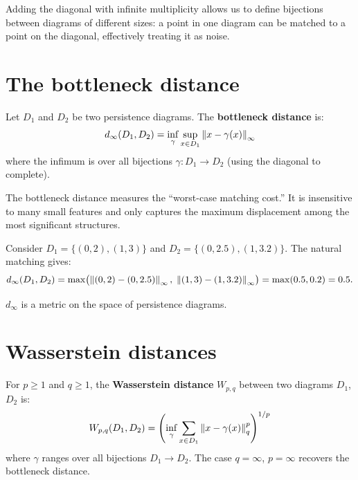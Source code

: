\begin{remark}
Adding the diagonal with infinite multiplicity allows us to define
bijections between diagrams of different sizes: a point in one diagram
can be matched to a point on the diagonal, effectively treating it
as noise.
\end{remark}

\section{The bottleneck distance}
\label{sec:bottleneck}

\begin{definition}
\label{def:bottleneck}
Let $D_1$ and $D_2$ be two persistence diagrams. The
\textbf{bottleneck distance} is:
\[
  d_\infty(D_1, D_2) = \inf_{\gamma} \sup_{x \in D_1}
    \left\| x - \gamma(x) \right\|_\infty
\]
where the infimum is over all bijections $\gamma : D_1 \to D_2$
(using the diagonal to complete).
\end{definition}

\begin{intuition}
The bottleneck distance measures the ``worst-case matching cost.''
It is insensitive to many small features and only captures the
maximum displacement among the most significant structures.
\end{intuition}

\begin{example}
Consider $D_1 = \{(0, 2), (1, 3)\}$ and $D_2 = \{(0, 2.5), (1, 3.2)\}$.
The natural matching gives:
\[
  d_\infty(D_1, D_2) = \max\bigl(\left\| (0,2)-(0,2.5) \right\|_\infty,\;
  \left\| (1,3)-(1,3.2) \right\|_\infty\bigr) = \max(0.5, 0.2) = 0.5.
\]
\end{example}

\begin{proposition}
$d_\infty$ is a metric on the space of persistence diagrams.
\end{proposition}

\section{Wasserstein distances}
\label{sec:wasserstein}

\begin{definition}
\label{def:wasserstein}
For $p \geq 1$ and $q \geq 1$, the \textbf{Wasserstein distance}
$W_{p,q}$ between two diagrams $D_1$, $D_2$ is:
\[
  W_{p,q}(D_1, D_2) = \left(\inf_{\gamma}
    \sum_{x \in D_1} \left\| x - \gamma(x) \right\|_q^p\right)^{1/p}
\]
where $\gamma$ ranges over all bijections $D_1 \to D_2$.
The case $q = \infty$, $p = \infty$ recovers the bottleneck distance.
\end{definition}

